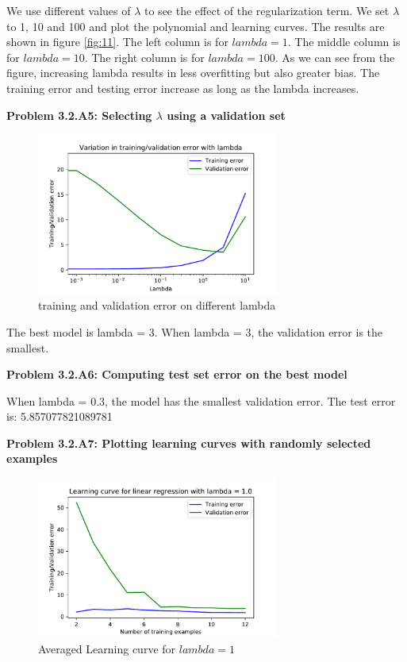 \documentclass[]{book}
\theoremstyle{definition}
\begin{document}
\begin{flushleft}
	We use different values of $\lambda$ to see the effect of the regularization term. We set $\lambda$ to 1, 10 and 100 and plot the polynomial and learning curves. The results are shown in figure \ref{fig:11}. The left column is for $lambda = 1$. The middle column is for $lambda = 10$. The right column is for $lambda = 100$. As we can see from the figure, increasing lambda results in less overfitting but also greater bias. The training error and testing error increase as long as the lambda increases.
\end{flushleft}
\textbf{Problem 3.2.A5: Selecting $\lambda$ using a validation set}
\begin{figure}[H]
	\centering
	\includegraphics[width=8cm]{fig10to11.pdf}
	\caption{training and validation error on different lambda}
	\label{fig:12}
\end{figure}
\begin{flushleft}
	The best model is lambda = 3. When lambda = 3, the validation error is the smallest. 
\end{flushleft}
\textbf{Problem 3.2.A6: Computing test set error on the best model}
\begin{flushleft}
	When lambda = 0.3, the model has the smallest validation error. The test error is: 5.857077821089781
\end{flushleft}
\textbf{Problem 3.2.A7: Plotting learning curves with randomly selected examples}
\begin{figure}[H]
	\centering
	\includegraphics[width=8cm]{fig11.pdf}
	\caption{Averaged Learning curve for $lambda = 1$}
	\label{fig:13}
\end{figure}
\end{document}
